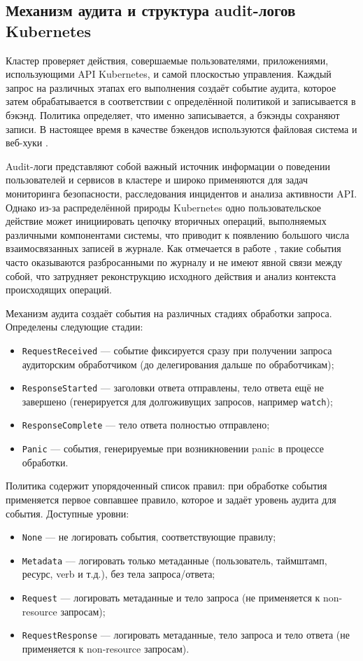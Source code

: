 \subsection{Механизм аудита и структура audit-логов Kubernetes}

Кластер проверяет действия, совершаемые пользователями, приложениями, использующими API Kubernetes, и самой плоскостью управления. Каждый запрос на различных этапах его выполнения создаёт событие аудита, которое затем обрабатывается в соответствии с определённой политикой и записывается в бэкэнд. Политика определяет, что именно записывается, а бэкэнды сохраняют записи. В настоящее время в качестве бэкендов используются файловая система и веб-хуки \cite{KubernetesAudit}.

Audit-логи представляют собой важный источник информации о поведении пользователей и сервисов в кластере и широко применяются для задач мониторинга безопасности, расследования инцидентов и анализа активности API. Однако из-за распределённой природы Kubernetes одно пользовательское действие может инициировать цепочку вторичных операций, выполняемых различными компонентами системы, что приводит к появлению большого числа взаимосвязанных записей в журнале. Как отмечается в работе \cite{K8NTEXT}, такие события часто оказываются разбросанными по журналу и не имеют явной связи между собой, что затрудняет реконструкцию исходного действия и анализ контекста происходящих операций.

Механизм аудита создаёт события на различных стадиях обработки запроса. Определены следующие стадии:

\begin{itemize}
    \item \texttt{RequestReceived} --- событие фиксируется сразу при получении запроса аудиторским обработчиком (до делегирования дальше по обработчикам);
    \item \texttt{ResponseStarted} --- заголовки ответа отправлены, тело ответа ещё не завершено (генерируется для долгоживущих запросов, например \texttt{watch});
    \item \texttt{ResponseComplete} --- тело ответа полностью отправлено;
    \item \texttt{Panic} --- события, генерируемые при возникновении panic в процессе обработки.
\end{itemize}

Политика содержит упорядоченный список правил: при обработке события применяется первое совпавшее правило, которое и задаёт уровень аудита для события. Доступные уровни:

\begin{itemize}
    \item \texttt{None} --- не логировать события, соответствующие правилу;
    \item \texttt{Metadata} --- логировать только метаданные (пользователь, таймштамп, ресурс, verb и т.д.), без тела запроса/ответа;
    \item \texttt{Request} --- логировать метаданные и тело запроса (не применяется к non-resource запросам);
    \item \texttt{RequestResponse} --- логировать метаданные, тело запроса и тело ответа (не применяется к non-resource запросам).
\end{itemize}